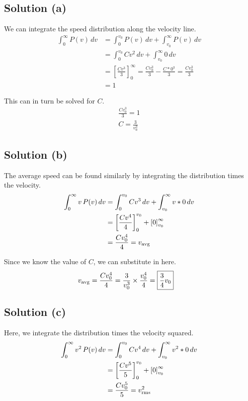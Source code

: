 \documentclass[12pt]{article}
\begin{document}
        \subsection{Solution (a)}
            We can integrate the speed distribution along the velocity line.
            \begin{align}
                \int_{0}^{\infty} P(v)\,dv  &=  \int_{0}^{v_0} P(v)\,dv + \int_{v_0}^{\infty} P(v)\,dv\\
                    &=  \int_{0}^{v_0} Cv^2\,dv + \int_{v_0}^{\infty} 0\,dv\\
                    &=  \left[ \frac{Cv^3}{3} \right]_0^\infty
                    =   \frac{Cv_0^3}{3} - \frac{C*0^3}{3}
                    =   \frac{Cv_0^3}{3}\\
                    &=  1
            \end{align}

            This can in turn be solved for $C$.
            \begin{gather}
                \frac{Cv_0^3}{3}    =   1\\
                \boxed{C = \frac{3}{v_0^3}}
            \end{gather}

        \subsection{Solution (b)}
            The average speed can be found similarly by integrating the distribution times the velocity.
            \begin{align}
                \int_{0}^{\infty} v\,P(v)\,dv   &=  \int_{0}^{v_0} Cv^3\,dv + \int_{v_0}^{\infty} v * 0\,dv\\
                    &=  \left[ \frac{Cv^4}{4} \right]_0^{v_0} + \left[ 0 \right]_{v_0}^\infty\\
                    &=  \frac{Cv_0^4}{4}
                    =   v_{\rm avg}
            \end{align}

            Since we know the value of $C$, we can substitute in here.
            \begin{align}
                v_{\rm avg} &=  \frac{Cv_0^4}{4}
                    =   \frac{3}{v_0^3} \times \frac{v_0^4}{4}
                    =   \boxed{\frac{3}{4}v_0}
            \end{align}

        \subsection{Solution (c)}
            Here, we integrate the distribution times the velocity squared.
            \begin{align}
                \int_{0}^{\infty} v^2\,P(v)\,dv &=  \int_{0}^{v_0} Cv^4\,dv + \int_{v_0}^{\infty} v^2 * 0\,dv\\
                    &=  \left[ \frac{Cv^5}{5} \right]_0^{v_0} + \left[ 0 \right]_{v_0}^\infty\\
                    &=  \frac{Cv_0^5}{5}
                    =   v_{\rm rms}^2
            \end{align}
\end{document}

